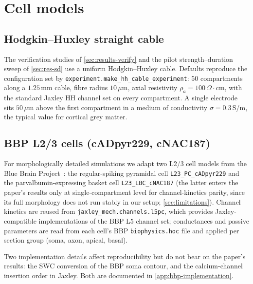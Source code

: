 \section{Cell models}\label{sec:cells}

\subsection{Hodgkin--Huxley straight cable}\label{sec:cells-hh}

The verification studies of \cref{sec:results-verify} and the pilot
strength--duration sweep of \cref{sec:res-sd} use a uniform
Hodgkin--Huxley cable. Defaults reproduce the configuration set by
\texttt{experiment.make\_hh\_cable\_experiment}: $50$ compartments
along a $1.25\,$mm cable, fibre radius $10\,\mu$m, axial resistivity
$\rho_a = 100\,\Omega\cdot$cm, with the standard Jaxley HH channel set on
every compartment. A single electrode sits $50\,\mu$m above the first
compartment in a medium of conductivity $\sigma = 0.3\,$S/m, the typical
value for cortical grey matter.

\subsection{BBP L2/3 cells (cADpyr229, cNAC187)}\label{sec:cells-bbp}

For morphologically detailed simulations we adapt two L2/3 cell models
from the Blue Brain Project~\cite{markram2015reconstruction}: the
regular-spiking pyramidal cell \texttt{L23\_PC\_cADpyr229} and the
parvalbumin-expressing basket cell \texttt{L23\_LBC\_cNAC187} (the
latter enters the paper's results only at single-compartment level for
channel-kinetics parity, since its full morphology does not run stably
in our setup; \cref{sec:limitations}). Channel kinetics are reused from
\texttt{jaxley\_mech.channels.l5pc}, which provides Jaxley-compatible
implementations of the BBP L5 channel set; conductances and passive
parameters are read from each cell's BBP \texttt{biophysics.hoc} file
and applied per section group (soma, axon, apical, basal).

Two implementation details affect reproducibility but do not bear on
the paper's results: the SWC conversion of the BBP soma contour, and
the calcium-channel insertion order in Jaxley. Both are documented in
\cref{app:bbp-implementation}.

